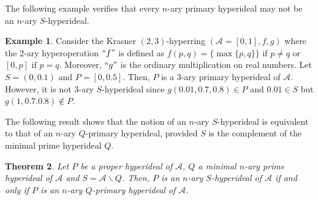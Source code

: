 \documentclass[preprint,review,10pt]{amsart}
\newtheorem{theorem}{Theorem}[section]
\theoremstyle{definition}
\newtheorem{example}[theorem]{Example}
\theoremstyle{remark}
\numberwithin{equation}{section}
\begin{document}
The following example verifies that every $n$-ary primary hyperideal may not be an $n$-ary $S$-hyperideal.

\begin{example}
Consider the Krasner $(2,3)$-hyperring $(\mathscr{A}=[0,1],f,g )$ where the 2-ary hyperoperation $``f"$ is defined as $f(p,q) =\{\max\{p, q\}\}$ if $p \neq q$ or $[0,p]$ if $p =q.$ 
Moreover, $``g"$ is the ordinary multiplication on real numbers. Let  $S=(0,0.1)$ and $P=[0,0.5]$. Then, $P$ is a $3$-ary primary hyperideal of $\mathscr{A}$. However,  it is not $3$-ary $S$-hyperideal since $g(0.01,0.7,0.8) \in P $ and $0.01 \in S$ but $g(1,0.7.0.8) \notin P$.
\end{example}
The following result shows that the notion of an $n$-ary $S$-hyperideal is equivalent to that of an $n$-ary $Q$-primary hyperideal,  provided $S$ is the  complement of the minimal prime hyperideal $Q$.
\begin{theorem} \label{ejavad}
Let $P$ be a proper hyperideal of $\mathscr{A}$, $Q$  a  minimal $n$-ary prime hyperideal of $\mathscr{A}$ and $S=\mathscr{A} \backslash Q$. Then, $P$ is an $n$-ary $S$-hyperideal of $\mathscr{A}$ if and only if $P$ is an $n$-ary $Q$-primary hyperideal of $\mathscr{A}$.
\end{theorem}
\end{document}

